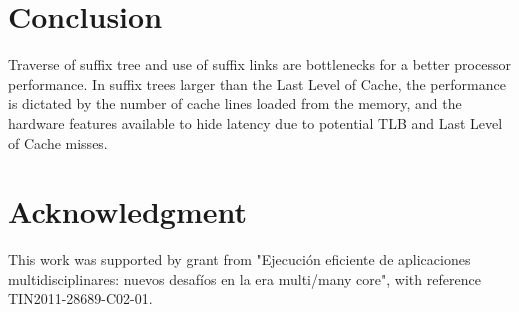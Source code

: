 \documentclass[conference]{IEEEtran}
\begin{document}


 
\section{Conclusion}
Traverse of suffix tree and use of suffix links are bottlenecks for a better processor performance. In suffix trees larger than the Last Level of Cache, the performance is dictated by the number of cache lines loaded from the memory, and the hardware features available to hide latency due to potential TLB and Last Level of Cache misses.
\section*{Acknowledgment}
This work was supported by grant from "Ejecuci\'on eficiente de aplicaciones multidisciplinares: nuevos desaf\'ios en la era multi/many core", with reference TIN2011-28689-C02-01.




\end{document}
